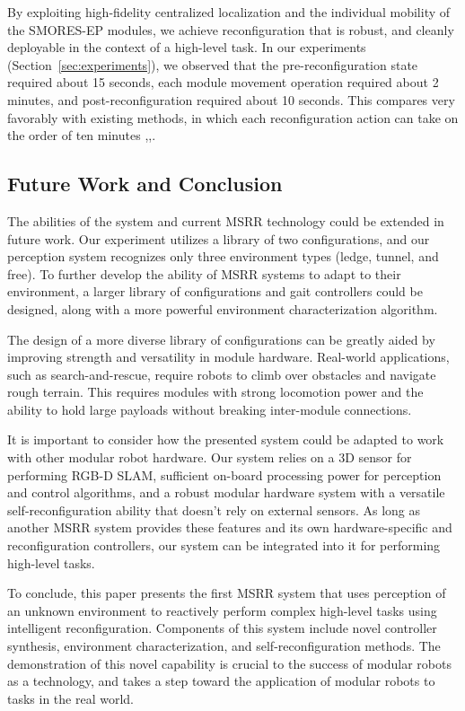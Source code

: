 \documentclass[conference]{IEEEtran}
\newcommand{\TODO}[1]{ {\bf \textcolor{red}{TODO:} #1 }}
\begin{document}
By exploiting high-fidelity centralized localization and the individual mobility of the SMORES-EP modules, we achieve reconfiguration that is robust, and cleanly deployable in the context of a high-level task. In our experiments (Section~\ref{sec:experiments}), we observed that the pre-reconfiguration state required about 15 seconds, each module movement operation required about 2 minutes, and post-reconfiguration required about 10 seconds.
This compares very favorably with existing methods, in which each reconfiguration action can take on the order of ten minutes \cite{Yim2007},\cite{Murata2006},\cite{Rubenstein2004}.
%
\subsection{Future Work and Conclusion}
%
The abilities of the system and current MSRR technology could be extended in future work.  Our experiment utilizes a library of two configurations, and our perception system recognizes only three environment types (ledge, tunnel, and free).  To further develop the ability of MSRR systems to adapt to their environment, a larger library of configurations and gait controllers could be designed, along with a more powerful environment characterization algorithm.

The design of a more diverse library of configurations can be greatly aided by improving strength and versatility in module hardware. Real-world applications, such as search-and-rescue, require robots to climb over obstacles and navigate rough terrain. This requires modules with strong locomotion power and the ability to hold large payloads without breaking inter-module connections.

It is important to consider how the presented system could be adapted to work with other modular robot hardware. Our system relies on a 3D sensor for performing RGB-D SLAM, sufficient on-board processing power for perception and control algorithms, and a robust modular hardware system with a versatile self-reconfiguration ability that doesn't rely on external sensors. As long as another MSRR system provides these features and its own hardware-specific and reconfiguration controllers, our system can be integrated into it for performing high-level tasks.

To conclude, this paper presents the first MSRR system that uses perception of an unknown environment to reactively perform complex high-level tasks using intelligent reconfiguration. Components of this system include novel controller synthesis, environment characterization, and self-reconfiguration methods. The demonstration of this novel capability is crucial to the success of modular robots as a technology, and takes a step toward the application of modular robots to tasks in the real world.
%
%
\end{document}
